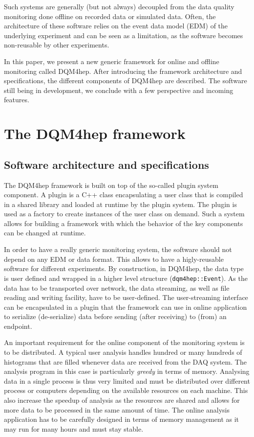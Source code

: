\documentclass{webofc}
\begin{document}
Such systems are generally (but not always) decoupled from the data quality monitoring done offline on recorded data or simulated data.
Often, the architecture of these software relies on the event data model (EDM) of the underlying experiment and 
can be seen as a limitation, as the software becomes non-reusable by other experiments.

In this paper, we present a new generic framework for online and offline monitoring called DQM4hep. 
After introducing the framework architecture and specifications, the different components of DQM4hep are described. 
The software still being in development, we conclude with a few perspective and incoming features.

\section{The DQM4hep framework}
\label{sec:framework}

\subsection{Software architecture and specifications}
\label{subsec:arch}

The DQM4hep framework is built on top of the so-called plugin system component. 
A plugin is a C++ class encapsulating a user class that is compiled in a shared library and loaded at runtime by the plugin system. 
The plugin is used as a factory to create instances of the user class on demand.
Such a system allows for building a framework with which the behavior of the key components can be changed at runtime. 

In order to have a really generic monitoring system, the software should not depend on any EDM or data format. 
This allows to have a higly-reusable software for different experiments. 
By construction, in DQM4hep, the data type is user defined and wrapped in a higher level structure (\texttt{dqm4hep::Event}). 
As the data has to be transported over network, the data streaming, as well as file reading and writing facility, have to be user-defined.
The user-streaming interface can be encapsulated in a plugin that the framework can use in online application to serialize (de-serialize) 
data before sending (after receiving) to (from) an endpoint.

An important requirement for the online component of the monitoring system is to be distributed. 
A typical user analysis handles hundred or many hundreds of histograms that are filled whenever data are received from the DAQ system. 
The analysis program in this case is particularly \textit{greedy} in terms of memory. 
Analysing data in a single process is thus very limited and must be distributed over different process or computers depending on 
the available resources on each machine. This also increase the speedup of analysis as the resources are shared and allows for 
more data to be processed in the same amount of time. The online analysis application has to be carefully designed in terms of 
memory management as it may run for many hours and must stay stable.
\end{document}
